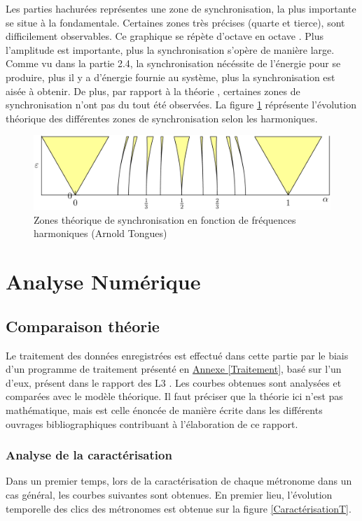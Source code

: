 \documentclass[a4paper,11pt]{report}
\begin{document}
Les parties hachurées représentes une zone de synchronisation, la plus importante se situe à la fondamentale. Certaines zones très précises (quarte et tierce), sont difficilement observables. Ce graphique se répète d'octave en octave \cite{panta}. Plus l'amplitude est importante, plus la synchronisation s'opère de manière large. Comme vu dans la partie 2.4, la synchronisation nécéssite de l'énergie pour se produire, plus il y a d'énergie fournie au système, plus la synchronisation est aisée à obtenir.  De plus, par rapport à la théorie \cite{wiki}, certaines zones de synchronisation n'ont pas du tout été observées. La figure \ref{ArnoldT} réprésente l'évolution théorique des différentes zones de synchronisation selon les harmoniques.
\begin{figure}[h]
\centering
\includegraphics[width=1\textwidth]{Arnold_tongues}
\caption{Zones théorique de synchronisation en fonction de fréquences harmoniques (Arnold Tongues)}\label{ArnoldT}
\end{figure}

\chapter{Analyse Numérique}
\section{Comparaison théorie}
Le traitement des données enregistrées est effectué dans cette partie par le biais d'un programme de traitement présenté en \underline{Annexe \ref{Traitement}}, basé sur l'un d'eux, présent dans le rapport des L3 \cite{ram}. Les courbes obtenues sont analysées et comparées avec le modèle théorique. Il faut préciser que la théorie ici n'est pas mathématique, mais est celle énoncée de manière écrite dans les différents ouvrages bibliographiques contribuant à l'élaboration de ce rapport.

\subsection{Analyse de la caractérisation}
Dans un premier temps, lors de la caractérisation de chaque métronome dans un cas général, les courbes suivantes sont obtenues. En premier lieu, l'évolution temporelle des clics des métronomes est obtenue sur la figure \ref{CaractérisationT}.
\end{document}
